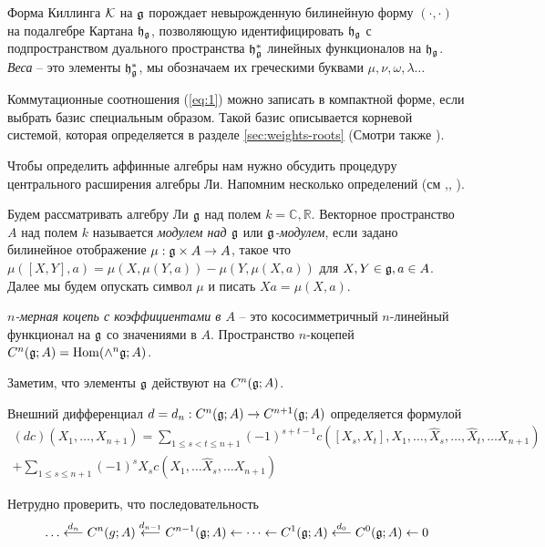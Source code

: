 Форма Киллинга ${\cal K}$ на  $\mathfrak{g}$ порождает невырожденную билинейную форму $(\cdot,\cdot)$ на подалгебре Картана $\mathfrak{h}_{\mathfrak{g}}$, позволяющую идентифицировать $\mathfrak{h}_{\mathfrak{g}}$ с подпространством дуального пространства  $\mathfrak{h}_{\mathfrak{g}}^{*}$ линейных функционалов на $\mathfrak{h}_{\mathfrak{g}}$. {\it Веса}  -- это элементы  $\mathfrak{h}_{\mathfrak{g}}^{*}$, мы обозначаем их греческими буквами $\mu,\nu, \omega, \lambda\dots$


Коммутационные соотношения  (\ref{eq:1}) можно записать в компактной форме, если выбрать базис специальным образом. Такой базис описывается корневой системой, которая определяется в разделе \ref{sec:weights-roots} (Смотри также \cite{humphreys1997introduction,humphreys1992reflection}).

Чтобы определить аффинные алгебры нам нужно обсудить процедуру центрального расширения алгебры Ли.
Напомним несколько определений (см \cite{fuks1986cohomology},\cite{fuks1984}, \cite{feigin1988}).
\begin{definition}
\label{def:1}
Будем рассматривать алгебру Ли $\mathfrak{g}$ над полем $k=\mathbb{C},\mathbb{R}$. Векторное пространство $A$ над полем $k$ называется {\it модулем над $\mathfrak{g}$} или {\it $\mathfrak{g}$-модулем}, если задано билинейное отображение $\mu:\mathfrak{g}\times A\to A$, такое что $\mu([X,Y],a)=\mu(X,\mu(Y,a))-\mu(Y,\mu(X,a))$ для $X,Y\in \mathfrak{g}, a\in A$. Далее мы будем опускать символ $\mu$ и писать $X a= \mu(X,a)$.
\end{definition}
\begin{definition}
  {\it $n$-мерная коцепь с коэффициентами в $A$} -- это кососимметричный $n$-линейный функционал на $\mathfrak{g}$ со значениями в $A$. Пространство $n$-коцепей $C^{n}(\mathfrak{g};A)=\mathrm{Hom}(\wedge^{n}\mathfrak{g};A)$.
\end{definition}
Заметим, что элементы $\mathfrak{g}$ действуют на $C^{n}(\mathfrak{g};A)$.
\begin{definition}
  Внешний дифференциал $d=d_{n}:C^{n}(\mathfrak{g};A)\to C^{n+1}(\mathfrak{g};A)$ определяется формулой
  \begin{multline}
    \label{eq:68}
    (dc) (X_{1},\dots, X_{n+1})=\sum_{1\leq s<t\leq n+1} (-1)^{s+t-1} c([X_{s},X_{t}],X_{1},\dots,\hat X_{s},\dots,\hat X_{t},\dots X_{n+1})\\
    +\sum_{1\leq s\leq n+1} (-1)^{s}X_{s} c(X_{1},\dots \hat X_{s},\dots X_{n+1})
  \end{multline}
\end{definition}
Нетрудно проверить, что последовательность
\begin{equation}
  \label{eq:40}
  \dots\stackrel{d_{n}}{\longleftarrow} C^{n}(g;A)\stackrel{d_{n-1}}{\longleftarrow} C^{n-1}(\mathfrak{g};A)\leftarrow \dots \leftarrow C^{1}(\mathfrak{g};A) \stackrel{d_{0}}{\longleftarrow} C^{0}(\mathfrak{g};A)\leftarrow 0
\end{equation}

